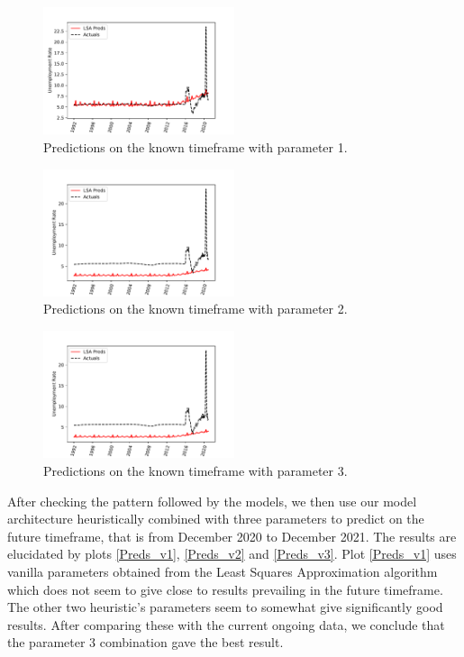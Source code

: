 \documentclass[10pt,journal,compsoc]{IEEEtran}
\begin{document}
\begin{figure}[!t]
	\centering
	\includegraphics[width=0.5\textwidth]{Figures/LSA_Preds_params1.pdf}
	\caption{Predictions on the known timeframe with parameter 1.}
	\label{LSA_Preds_params1}
\end{figure}

\begin{figure}[!t]
	\centering
	\includegraphics[width=0.5\textwidth]{Figures/LSA_Preds_params2.pdf}
	\caption{Predictions on the known timeframe with parameter 2.}
	\label{LSA_Preds_params2}
\end{figure}

\begin{figure}[!t]
	\centering
	\includegraphics[width=0.5\textwidth]{Figures/LSA_Preds_params3.pdf}
	\caption{Predictions on the known timeframe with parameter 3.}
	\label{LSA_Preds_params3}
\end{figure}

After checking the pattern followed by the models, we then use our model architecture heuristically combined with three parameters to predict on the future timeframe, that is from December 2020 to December 2021. The results are elucidated by plots \ref{Preds_v1}, \ref{Preds_v2} and \ref{Preds_v3}. Plot \ref{Preds_v1} uses vanilla parameters obtained from the Least Squares Approximation algorithm which does not seem to give close to results prevailing in the future timeframe. The other two heuristic's parameters seem to somewhat give significantly good results. After comparing these with the current ongoing data, we conclude that the parameter 3 combination gave the best result.
\end{document}
